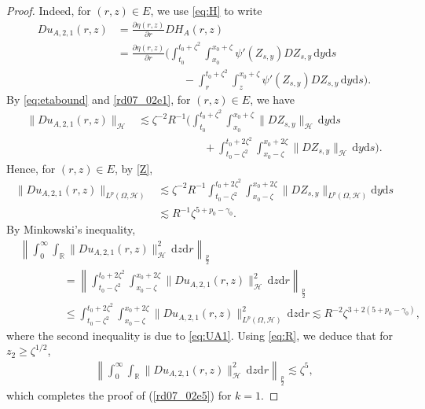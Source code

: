 \documentclass[10pt,a4paper]{amsart}
\newcommand {\deltah}{{\zeta}}
\newcommand{\R}{{\mathbb{R}}}
\renewcommand{\d}{\mathrm{d}}
\begin{document}
\begin{proof}
 Indeed, for $(r,z)\in E$, we use \eqref{eq:H} to write
           \begin{align*}
           Du_{A,2,1}(r,z) &= \frac{\partial \eta(r,z)}{\partial r}DH_A(r,z)\\
           &=\frac{\partial \eta(r,z)}{\partial r} \Big(\int_{t_0}^{t_0+\deltah^2}\int_{x_0}^{x_0+\deltah}\psi'(Z_{s,y})DZ_{s,y}\, \d y\d s \\
           & \qquad \qquad \qquad - \int_{r}^{t_0+\deltah^2}\int_{z}^{x_0+\deltah}\psi'(Z_{s,y})DZ_{s,y}\, \d y\d s\Big).
           \end{align*}
 By \eqref{eq:etabound} and \eqref{rd07_02e1},  for $(r,z)\in E$, we have
           \begin{align*}
           \|Du_{A,2,1}(r,z)\|_{\mathcal{H}}&\lesssim \deltah^{-2}R^{-1}\Big(\int_{t_0}^{t_0+\deltah^2}\int_{x_0}^{x_0+\deltah}\|DZ_{s,y}\|_{\mathcal{H}}\, \d y\d s \\
      &\qquad\qquad\qquad +\int_{t_0-\deltah^2}^{t_0+2\deltah^2}\int_{x_0-\deltah}^{x_0+2\deltah}\|DZ_{s,y}\|_{\mathcal{H}}\, \d y\d s\Big).
           \end{align*}
Hence, for $(r,z)\in E$, by \eqref{Z}, 
           \begin{align}\label{eq:UA1}
           \|Du_{A,2,1}(r,z)\|_{L^p(\Omega, \mathcal{H})} &\lesssim \deltah^{-2}R^{-1}
\int_{t_0-\deltah^2}^{t_0+2\deltah^2}\int_{x_0-\deltah}^{x_0+2\deltah}\|DZ_{s,y}\|_{L^p(\Omega,\mathcal{H})}\d y\d s\nonumber\\
           &\lesssim R^{-1}\deltah^{5+p_0-\gamma_0}.
           \end{align}
By Minkowski's inequality, 
           \begin{align*}
           &\left\|\int_0^\infty\int_\R \|Du_{A,2,1}(r,z)\|_\mathcal{H}^2\, \d z\d r\right\|_{\frac p2} \\
           &\qquad\qquad =\left\|\int_{t_0-\deltah^2}^{t_0+2\deltah^2}\int_{x_0-\deltah}^{x_0+2\deltah} \|Du_{A,2,1}(r,z)\|_\mathcal{H}^2\, \d z\d r\right\|_{\frac p2}\\
           &\qquad\qquad \leq \int_{t_0-\deltah^2}^{t_0+2\deltah^2}\int_{x_0-\deltah}^{x_0+2\deltah} \|Du_{A,2,1}(r,z)\|_{L^p(\Omega, \mathcal{H})}^2\, \d z\d r
           \lesssim R^{-2}\deltah^{3+2(5+p_0-\gamma_0)},
           \end{align*}
where the second inequality is due to \eqref{eq:UA1}. Using \eqref{eq:R}, 
we deduce that for $z_2\geq \deltah^{1/2}$,
           \begin{align*}
           \left\|\int_0^\infty\int_\R \|Du_{A,2,1}(r,z)\|_\mathcal{H}^2\, \d z\d r\right\|_{\frac p2} \lesssim \deltah^{5},
           \end{align*}
           which completes the proof of (\ref{rd07_02e5}) for $k=1$.
  \medskip
  

\end{proof}
\end{document}
